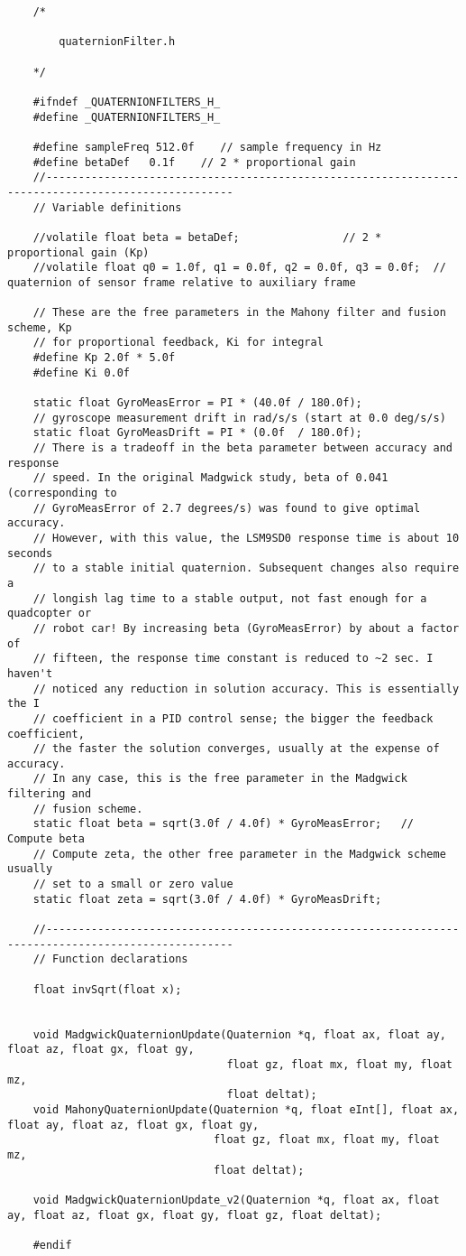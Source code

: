 	\begin{lstlisting}
	/*

		quaternionFilter.h

	*/

	#ifndef _QUATERNIONFILTERS_H_
	#define _QUATERNIONFILTERS_H_

	#define sampleFreq 512.0f    // sample frequency in Hz
	#define betaDef   0.1f    // 2 * proportional gain
	//---------------------------------------------------------------------------------------------------
	// Variable definitions

	//volatile float beta = betaDef;                // 2 * proportional gain (Kp)
	//volatile float q0 = 1.0f, q1 = 0.0f, q2 = 0.0f, q3 = 0.0f;  // quaternion of sensor frame relative to auxiliary frame

	// These are the free parameters in the Mahony filter and fusion scheme, Kp
	// for proportional feedback, Ki for integral
	#define Kp 2.0f * 5.0f
	#define Ki 0.0f

	static float GyroMeasError = PI * (40.0f / 180.0f);
	// gyroscope measurement drift in rad/s/s (start at 0.0 deg/s/s)
	static float GyroMeasDrift = PI * (0.0f  / 180.0f);
	// There is a tradeoff in the beta parameter between accuracy and response
	// speed. In the original Madgwick study, beta of 0.041 (corresponding to
	// GyroMeasError of 2.7 degrees/s) was found to give optimal accuracy.
	// However, with this value, the LSM9SD0 response time is about 10 seconds
	// to a stable initial quaternion. Subsequent changes also require a
	// longish lag time to a stable output, not fast enough for a quadcopter or
	// robot car! By increasing beta (GyroMeasError) by about a factor of
	// fifteen, the response time constant is reduced to ~2 sec. I haven't
	// noticed any reduction in solution accuracy. This is essentially the I
	// coefficient in a PID control sense; the bigger the feedback coefficient,
	// the faster the solution converges, usually at the expense of accuracy.
	// In any case, this is the free parameter in the Madgwick filtering and
	// fusion scheme.
	static float beta = sqrt(3.0f / 4.0f) * GyroMeasError;   // Compute beta
	// Compute zeta, the other free parameter in the Madgwick scheme usually
	// set to a small or zero value
	static float zeta = sqrt(3.0f / 4.0f) * GyroMeasDrift;

	//---------------------------------------------------------------------------------------------------
	// Function declarations

	float invSqrt(float x);


	void MadgwickQuaternionUpdate(Quaternion *q, float ax, float ay, float az, float gx, float gy,
	                              float gz, float mx, float my, float mz,
	                              float deltat);
	void MahonyQuaternionUpdate(Quaternion *q, float eInt[], float ax, float ay, float az, float gx, float gy,
	                            float gz, float mx, float my, float mz,
	                            float deltat);

	void MadgwickQuaternionUpdate_v2(Quaternion *q, float ax, float ay, float az, float gx, float gy, float gz, float deltat);

	#endif
	\end{lstlisting}


